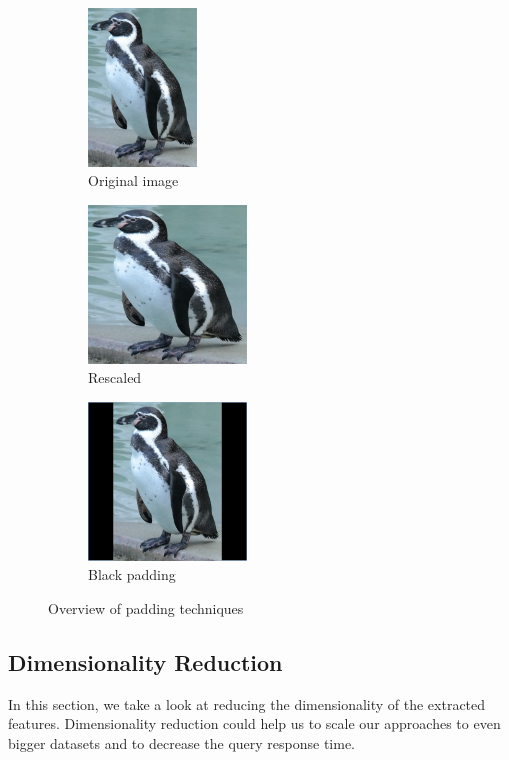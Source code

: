 \begin{figure}
     \centering
     \begin{subfigure}[b]{0.3\textwidth}
         \centering
         \includegraphics[height=4.2cm]{img/original.png}
         \caption{Original image}
     \end{subfigure}
     \hfill
     \begin{subfigure}[b]{0.3\textwidth}
         \centering
         \includegraphics[height=4.2cm]{img/original-distortion.png}
         \caption{Rescaled}
     \end{subfigure}
     \hfill
     \begin{subfigure}[b]{0.3\textwidth}
         \centering
         \includegraphics[height=4.2cm]{img/black_padding.png}
         \caption{Black padding}
     \end{subfigure}
        \caption{Overview of padding techniques}
        \label{fig:penguin}
\end{figure}

\subsection{Dimensionality Reduction}

In this section, we take a look at reducing the dimensionality of the extracted features. Dimensionality reduction could help us to scale our approaches to even bigger datasets and to decrease the query response time.

